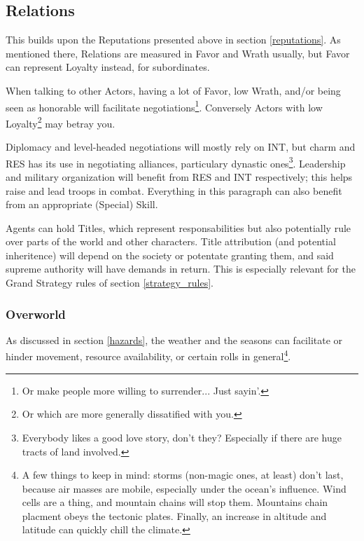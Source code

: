 \subsection{Relations}

\label{relations}

This builds upon the Reputations presented above in section \ref{reputations}. As mentioned there, Relations are measured in Favor and Wrath usually, but Favor can represent Loyalty instead, for subordinates.

When talking to other Actors, having a lot of Favor, low Wrath, and/or being seen as honorable will facilitate negotiations\footnote{Or make people more willing to surrender... Just sayin'.}. Conversely Actors with low Loyalty\footnote{Or which are more generally dissatified with you.} may betray you.

Diplomacy and level-headed negotiations will mostly rely on INT, but charm and RES has its use in negotiating alliances, particulary dynastic ones\footnote{Everybody likes a good love story, don't they? Especially if there are huge tracts of land involved.}. Leadership and military organization will benefit from RES and INT respectively; this helps raise and lead troops in combat. Everything in this paragraph can also benefit from an appropriate (Special) Skill.

Agents can hold Titles, which represent responsabilities but also potentially rule over parts of the world and other characters. Title attribution (and potential inheritence) will depend on the society or potentate granting them, and said supreme authority will have demands in return. This is especially relevant for the Grand Strategy rules of section \ref{strategy_rules}.



\subsubsection{Overworld}



As discussed in section \ref{hazards}, the weather and the seasons can facilitate or hinder movement, resource availability, or certain rolls in general\footnote{A few things to keep in mind: storms (non-magic ones, at least) don't last, because air masses are mobile, especially under the ocean's influence. Wind cells are a thing, and mountain chains will stop them. Mountains chain placment obeys the tectonic plates. Finally, an increase in altitude and latitude can quickly chill the climate.}. 

